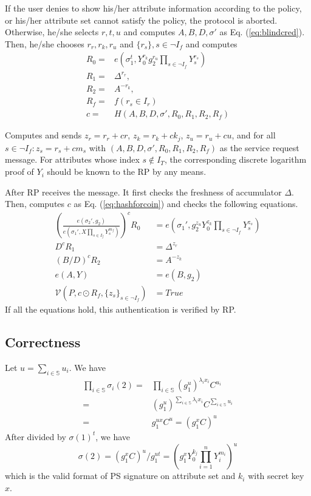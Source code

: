 \documentclass[journal]{IEEEtran}
\begin{document}
If the user denies to show his/her attribute information according to the policy, or his/her attribute set cannot satisfy the policy, the protocol is aborted. 
Otherwise, he/she selects $r, t, u$ and computes $A, B, D, \sigma'$ as Eq. (\ref{eq:blindcred}). Then, he/she chooses $r_r, r_k, r_u$ and $\{r_s\}, s\in \lnot I_f$ and computes 
\begin{align}
R_0 =& e(\sigma_1^t, Y_0^{r_k}g_2^{r_u}\prod_{s \in \lnot I_f} Y_s^{r_s}) \\
R_1 =& \Delta^{r_r},\\
R_2 =& A ^{-r_k},\\
R_f =& f(r_s\in I_r)\\
c = & H(A, B, D, \sigma', R_0, R_1, R_2, R_f) \label{eq:hashforcoin}
\end{align}

Computes and sends $z_r = r_r + cr$, $z_k = r_k + ck_j$, $z_u = r_u + cu$, and for all $s\in \lnot I_f: z_s = r_s + c m_s$ with $(A, B, D, \sigma', R_0, R_1, R_2, R_f)$ as the service request message. For attributes whose index $s\notin I_T$, the corresponding discrete logarithm proof of $Y_i$ should be known to the RP by any means.

After RP receives the message. It first checks the freshness of accumulator $\Delta$. Then, computes $c$ as Eq. (\ref{eq:hashforcoin}) and checks the following equations.
\begin{align}
(\frac{e(\sigma_2', g_2)}{e(\sigma_1', X\prod_{s \in I_f}Y_s^{m_f} )})^c R_0 & = e(\sigma_1', g_2^{z_u}Y_0^{z_k}\prod_{s \in \lnot I_f}Y_s^{z_s})\nonumber \\
D^c R_1 & = \Delta^{z_r} \\
(B/D)^c R_2 & = A^{-z_k} \\
e(A, Y) &= e(B, g_2) \\
\mathcal{V}(P, c\odot R_f, \{z_s\}_{s\in\lnot I_f}) &= True
\end{align}
If all the equations hold, this authentication is verified by RP.
\subsection{Correctness}
Let $u = \sum_{i\in\mathbb{S}}u_i $. We have 
\begin{align}
\prod_{i\in \mathbb{S}}\sigma_i(2) = &\prod_{i\in \mathbb{S}}(g_1^u)^{\lambda_i x_i}C^{u_i} \\
=& (g_1^u)^{\sum_{i\in\mathbb{S}}\lambda_i x_i} C^{\sum_{i\in\mathbb{S}}u_i}\\
=& g_1^{ux}C^u = (g_1^xC)^u
\end{align}
After divided by $\sigma(1)^t$, we have
$$\sigma(2) = (g_1^xC)^u/g_1^{ut} = (g_1^x Y_0^{k_j}\prod_{i=1}^nY_i^{m_i})^u$$
which is the valid format of PS signature on attribute set and $k_i$ with secret key $x$.
\end{document}

